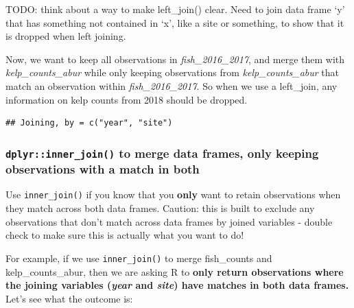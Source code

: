\documentclass[]{book}
\newenvironment{Shaded}{\begin{snugshade}}{\end{snugshade}}
\newcommand{\DecValTok}[1]{\textcolor[rgb]{0.00,0.00,0.81}{#1}}
\newcommand{\KeywordTok}[1]{\textcolor[rgb]{0.13,0.29,0.53}{\textbf{#1}}}
\newcommand{\NormalTok}[1]{#1}
\newcommand{\OperatorTok}[1]{\textcolor[rgb]{0.81,0.36,0.00}{\textbf{#1}}}
\newcommand{\StringTok}[1]{\textcolor[rgb]{0.31,0.60,0.02}{#1}}
\begin{document}
TODO: think about a way to make left\_join() clear. Need to join data frame `y' that has something not contained in `x', like a site or something, to show that it is dropped when left joining.

Now, we want to keep all observations in \emph{fish\_2016\_2017}, and merge them with \emph{kelp\_counts\_abur} while only keeping observations from \emph{kelp\_counts\_abur} that match an observation within \emph{fish\_2016\_2017}. So when we use a left\_join, any information on kelp counts from 2018 should be dropped.

\begin{Shaded}
\end{Shaded}

\begin{verbatim}
## Joining, by = c("year", "site")
\end{verbatim}

\hypertarget{dplyrinner_join-to-merge-data-frames-only-keeping-observations-with-a-match-in-both}{%
\subsubsection{\texorpdfstring{\texttt{dplyr::inner\_join()} to merge data frames, only keeping observations with a match in both}{dplyr::inner\_join() to merge data frames, only keeping observations with a match in both}}\label{dplyrinner_join-to-merge-data-frames-only-keeping-observations-with-a-match-in-both}}

Use \texttt{inner\_join()} if you know that you \textbf{only} want to retain observations when they match across both data frames. Caution: this is built to exclude any observations that don't match across data frames by joined variables - double check to make sure this is actually what you want to do!

For example, if we use \texttt{inner\_join()} to merge fish\_counts and kelp\_counts\_abur, then we are asking R to \textbf{only return observations where the joining variables (\emph{year} and \emph{site}) have matches in both data frames.} Let's see what the outcome is:

\begin{Shaded}
\end{Shaded}
\end{document}
